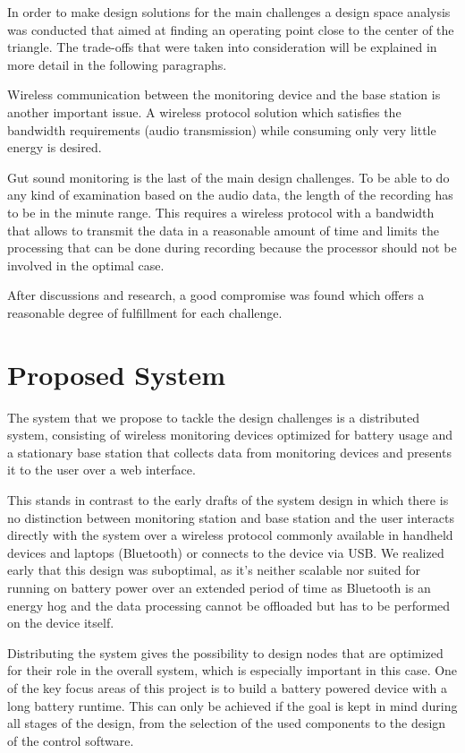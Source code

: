 In order to make design solutions for the main challenges a design space analysis was conducted that aimed at finding an operating point close to the center of the triangle. The trade-offs that were taken into consideration will be explained in more detail in the following paragraphs.  
 
Wireless communication between the monitoring device and the base station is another important issue. A wireless protocol solution which satisfies the bandwidth requirements (audio transmission) while consuming only very little energy is desired. 

Gut sound monitoring is the last of the main design challenges. To be able to do any kind of examination based on the audio data, the length of the recording has to be in the minute range. This requires a wireless protocol with a bandwidth that allows to transmit the data in a reasonable amount of time and limits the processing that can be done during recording because the processor should not be involved in the optimal case.


After discussions and research, a good compromise was found which offers a reasonable degree of fulfillment for each challenge.


\section{Proposed System}
The system that we propose to tackle the design challenges is a distributed system, consisting of wireless monitoring devices optimized for battery usage and a stationary base station that collects data from monitoring devices and presents it to the user over a web interface. 

This stands in contrast to the early drafts of the system design in which there is no distinction between monitoring station and base station and the user interacts directly with the system over a wireless protocol commonly available in handheld devices and laptops (Bluetooth) or connects to the device via USB. We realized early that this design was suboptimal, as it’s neither scalable nor suited for running on battery power over an extended period of time as Bluetooth is an energy hog and the data processing cannot be offloaded but has to be performed on the device itself.

Distributing the system gives the possibility to design nodes that are optimized for their role in the overall system, which is especially important in this case. One of the key focus areas of this project is to build a battery powered device with a long battery runtime. This can only be achieved if the goal is kept in mind during all stages of the design, from the selection of the used components to the design of the control software.

